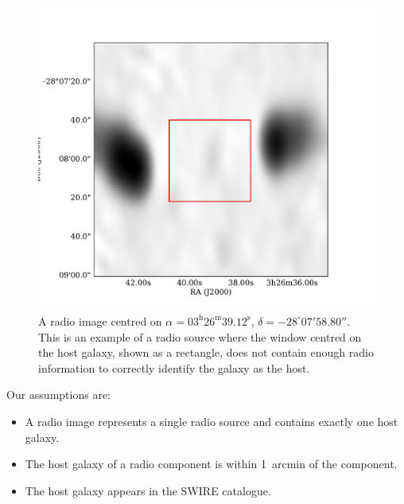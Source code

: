\documentclass[fleqn,usenatbib,usedcolumn]{mnras}
\begin{document}
        \begin{figure}
      \centering
      \includegraphics[width=\linewidth]{images/CI2363_fig.pdf}
      \caption{A radio image centred on $\alpha =
        03^\text{h}26^\text{m}39.12^\text{s}$, $\delta = -28^\circ{}07'58.80''$.        %
        This is an example of a radio source where the window centred on the
        host galaxy, shown as a rectangle, does not contain enough radio
        information to correctly identify the galaxy as the host.}
      \label{fig:broken-window-size}
    \end{figure}

  \label{sec:limitations}

    Our assumptions are:
    \begin{itemize}
      \item A radio image represents a single radio source and contains exactly
        one host galaxy.
      \item The host galaxy of a radio component is within 1~arcmin of the
        component.
      \item The host galaxy appears in the SWIRE catalogue.
    \end{itemize}
\end{document}
